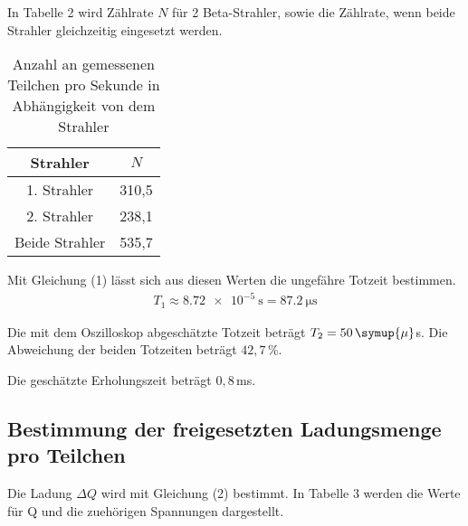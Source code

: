 In Tabelle 2 wird Zählrate $N$ für 2 Beta-Strahler, sowie die Zählrate, wenn beide Strahler gleichzeitig
eingesetzt werden.

\begin{table}[H]
  \centering
  \caption{Anzahl an gemessenen Teilchen pro Sekunde in Abhängigkeit von dem Strahler}
  \label{tab:Rechteckspannung}
  \begin{tabular}{c c}
    \toprule
    Strahler & $N$  \\
    \midrule
    1. Strahler & 310,5 \\
    2. Strahler & 238,1\\
    Beide Strahler & 535,7 \\
    \bottomrule
  \end{tabular}
\end{table}

Mit Gleichung (1) lässt sich aus diesen Werten die ungefähre Totzeit bestimmen.
\begin{align*}
  T_1 \approx \SI{8.72e-5}{\second} = \SI{87,2}{\micro\second}
\end{align*}

Die mit dem Oszilloskop abgeschätzte Totzeit beträgt $T_2 = 50 \, \symup{\mu} $s.
Die Abweichung der beiden Totzeiten beträgt $42,7 \, \%$.

Die geschätzte Erholungszeit beträgt $0,8 \,$ms.


\subsection{Bestimmung der freigesetzten Ladungsmenge pro Teilchen}

Die Ladung $\Delta Q$ wird mit Gleichung (2) bestimmt. In Tabelle 3 werden die Werte für Q und die zuehörigen Spannungen dargestellt.

